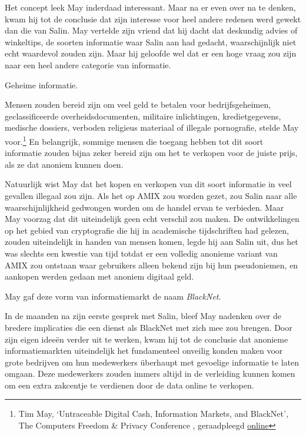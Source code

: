 \documentclass[
  a5paper,
  smalldemyvopaper,11pt,twoside,onecolumn,openright,extrafontsizes]{memoir}
\begin{document}
Het concept leek May inderdaad interessant. Maar na er even over na te
denken, kwam hij tot de conclusie dat zijn interesse voor heel andere
redenen werd gewekt dan die van Salin. May vertelde zijn vriend dat hij
dacht dat deskundig advies of winkeltips, de soorten informatie waar
Salin aan had gedacht, waarschijnlijk niet echt waardevol zouden zijn.
Maar hij geloofde wel dat er een hoge vraag zou zijn naar een heel
andere categorie van informatie.

Geheime informatie.

Mensen zouden bereid zijn om veel geld te betalen voor bedrijfsgeheimen,
geclassificeerde overheidsdocumenten, militaire inlichtingen,
kredietgegevens, medische dossiers, verboden religieus materiaal of
illegale pornografie, stelde May voor.\footnote{Tim May, `Untraceable
  Digital Cash, Information Markets, and BlackNet', The Computers
  Freedom \& Privacy Conference , geraadpleegd
  \href{https://web.archive.org/web/20130501134401/https://osaka.law.miami.edu//~froomkin/articles/tcmay.htm}{online}}
En belangrijk, sommige mensen die toegang hebben tot dit soort
informatie zouden bijna zeker bereid zijn om het te verkopen voor de
juiste prijs, als ze dat anoniem kunnen doen.

Natuurlijk wist May dat het kopen en verkopen van dit soort informatie
in veel gevallen illegaal zou zijn. Als het op AMIX zou worden gezet,
zou Salin naar alle waarschijnlijkheid gedwongen worden om de handel
ervan te verbieden. Maar May voorzag dat dit uiteindelijk geen echt
verschil zou maken. De ontwikkelingen op het gebied van cryptografie die
hij in academische tijdschriften had gelezen, zouden uiteindelijk in
handen van mensen komen, legde hij aan Salin uit, dus het was slechts
een kwestie van tijd totdat er een volledig anonieme variant van AMIX
zou ontstaan waar gebruikers alleen bekend zijn bij hun pseudoniemen, en
aankopen werden gedaan met anoniem digitaal geld.

May gaf deze vorm van informatiemarkt de naam \emph{BlackNet}.

In de maanden na zijn eerste gesprek met Salin, bleef May nadenken over
de bredere implicaties die een dienst als BlackNet met zich mee zou
brengen. Door zijn eigen ideeën verder uit te werken, kwam hij tot de
conclusie dat anonieme informatiemarkten uiteindelijk het fundamenteel
onveilig konden maken voor grote bedrijven om hun medewerkers überhaupt
met gevoelige informatie te laten omgaan. Deze medewerkers zouden immers
altijd in de verleiding kunnen komen om een extra zakcentje te verdienen
door de data online te verkopen.
\end{document}
